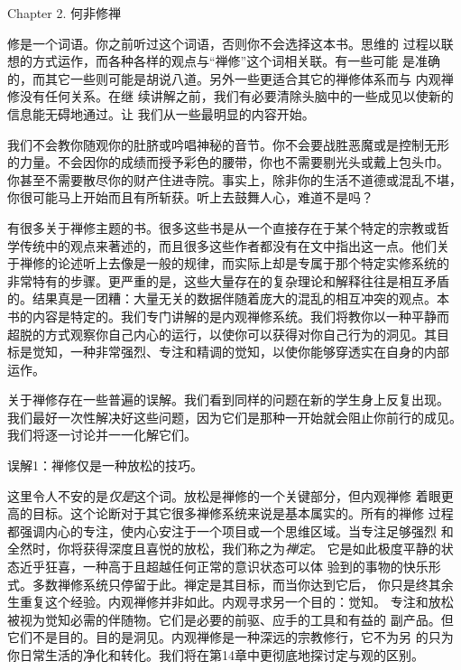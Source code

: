 


\beginchapter Chapter 2. 何非修禅


{
\parindent=3pc
\noindent\hang{}
\1%
{修是一个词语}。你之前听过这个词语，否则你不会选择这本书。思维的
过程以联想的方式运作，而各种各样的观点与“禅修”这个词相关联。有一些可能
是准确的，而其它一些则可能是胡说八道。另外一些更适合其它的禅修体系而与
内观禅修没有任何关系。在继
续讲解之前，我们有必要清除头脑中的一些成见以使新的信息能无碍地通过。让
我们从一些最明显的内容开始。

}

我们不会教你随观你的肚脐或吟唱神秘的音节。你不会要战胜恶魔或是控制无形
的力量。不会因你的成绩而授予彩色的腰带，你也不需要剔光头或戴上包头巾。
你甚至不需要散尽你的财产住进寺院。事实上，除非你的生活不道德或混乱不堪，
你很可能马上开始而且有所斩获。听上去鼓舞人心，难道不是吗？

有很多关于禅修主题的书。很多这些书是从一个直接存在于某个特定的宗教或哲
学传统中的观点来著述的，而且很多这些作者都没有在文中指出这一点。他们关
于禅修的论述听上去像是一般的规律，而实际上却是专属于那个特定实修系统的
非常\1特有的步骤。更严重的是，这些大量存在的复杂理论和解释往往是相互矛盾
的。结果真是一团糟：大量无关的数据伴随着庞大的混乱的相互冲突的观点。本
书的内容是特定的。我们专门讲解的是内观禅修系统。我们将教你以一种平静而
超脱的方式观察你自己内心的运行，以使你可以获得对你自己行为的洞见。其目
标是觉知，一种非常强烈、专注和精调的觉知，以使你能够穿透实在自身的内部
运作。

关于禅修存在一些普遍的误解。我们看到同样的问题在新的学生身上反复出现。
我们最好一次性解决好这些问题，因为它们是那种一开始就会阻止你前行的成见。
我们将逐一讨论并一一化解它们。

\subsectnon 误解1：禅修仅是一种放松的技巧。

这里令人不安的是{\it 仅是}这个词。放松是禅修的一个关键部分，但内观禅修
着眼更高的目标。这个论断对于其它很多禅修系统来说是基本属实的。所有的禅修
过程都强调内心的专注，使内心安注于一个项目或一个思维区域。当专注足够强烈
和全然时，你将获得深度且喜悦的放松，我们称之为{\it 禅定}。
它是如此极度平静的状态近乎狂喜，一种高于且超越任何正常的意识状态可以体
验到的事物的快乐形式。多数禅修系统只停留于此。禅定是其目标，而当你达到它后，
你只是终其余生重复这个经验。内观禅修\1并非如此。内观寻求另一个目的：觉知。
专注和放松被视为觉知必需的伴随物。它们是必要的前驱、应手的工具和有益的
副产品。但它们不是目的。目的是洞见。内观禅修是一种深远的宗教修行，它不为另
的只为你日常生活的净化和转化。我们将在第14章中更彻底地探讨定与观的区别。

\endchapter

\vfill\eject\byebye

